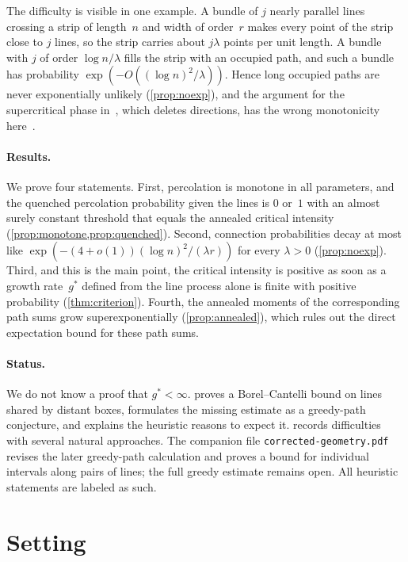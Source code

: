 \documentclass[11pt,letterpaper]{article}
\begin{document}
The difficulty is visible in one example. A bundle of $j$ nearly parallel lines crossing a strip of length~$n$ and width of order~$r$ makes every point of the strip close to $j$ lines, so the strip carries about $j\lambda$ points per unit length. A bundle with $j$ of order $\log n/\lambda$ fills the strip with an occupied path, and such a bundle has probability $\exp(-O((\log n)^2/\lambda))$. Hence long occupied paths are never exponentially unlikely (\cref{prop:noexp}), and the argument for the supercritical phase in~\cite{HJ26}, which deletes directions, has the wrong monotonicity here~\cite[Remark~6.1]{HJ26}.

\paragraph{Results.} We prove four statements. First, percolation is monotone in all parameters, and the quenched percolation probability given the lines is $0$ or~$1$ with an almost surely constant threshold that equals the annealed critical intensity (\cref{prop:monotone,prop:quenched}). Second, connection probabilities decay at most like $\exp(-(4+o(1))(\log n)^2/(\lambda r))$ for every $\lambda>0$ (\cref{prop:noexp}). Third, and this is the main point, the critical intensity is positive as soon as a growth rate~$g^*$ defined from the line process alone is finite with positive probability (\cref{thm:criterion}). Fourth, the annealed moments of the corresponding path sums grow superexponentially (\cref{prop:annealed}), which rules out the direct expectation bound for these path sums.

\paragraph{Status.} We do not know a proof that $g^*<\infty$.  proves a Borel--Cantelli bound on lines shared by distant boxes, formulates the missing estimate as a greedy-path conjecture, and explains the heuristic reasons to expect it.  records difficulties with several natural approaches. The companion file \texttt{corrected-geometry.pdf} revises the later greedy-path calculation and proves a bound for individual intervals along pairs of lines; the full greedy estimate remains open. All heuristic statements are labeled as such.

\section{Setting}
\label{sec:setting}
\end{document}
